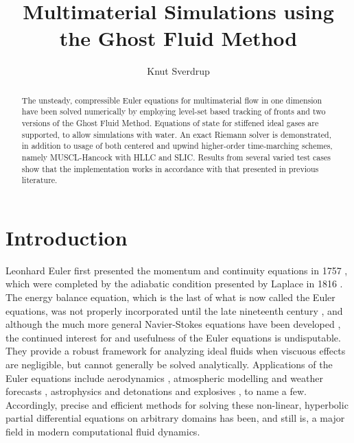\documentclass[final,3p,twocolumn]{elsarticle}
\begin{document}
\begin{frontmatter}

\title{Multimaterial Simulations using the Ghost Fluid Method}

\author{Knut Sverdrup}

\address{Cavendish Laboratory, Department of Physics, J J Thomson
  Avenue, Cambridge. CB3 0HE}

\begin{abstract}
    The unsteady, compressible Euler equations for multimaterial flow in one
    dimension have been solved numerically by employing level-set based
    tracking of fronts and two versions of the Ghost Fluid Method. Equations of
    state for stiffened ideal gases are supported, to allow simulations with
    water. An exact Riemann solver is demonstrated, in addition to usage of
    both centered and upwind higher-order time-marching schemes, namely
    MUSCL-Hancock with HLLC and SLIC. Results from several varied test cases
    show that the implementation works in accordance with that presented in
    previous literature. 
\end{abstract}

\end{frontmatter}

\section{Introduction}
\label{sec:introduction}

Leonhard Euler first presented the momentum and continuity equations in 1757
\cite{euler1757principes}, which were completed by the adiabatic condition
presented by Laplace in 1816 \cite{laplace1816vitesse}. The energy balance
equation, which is the last of what is now called the Euler equations,  was not
properly incorporated until the late nineteenth century
\cite{christodoulou2007euler}, and although the much more general Navier-Stokes
equations have been developed \cite{navier1822memoire, stokes1845theories}, the
continued interest for and usefulness of the Euler equations is undisputable.
They provide a robust framework for analyzing ideal fluids when viscuous
effects are negligible, but cannot generally be solved analytically.
Applications of the Euler equations include aerodynamics
\cite{drela1985twodimensional, anderson1986comparison, guruswamy1990unsteady},
atmospheric modelling and weather forecasts \cite{laprise1992euler,
skamarock2008time}, astrophysics \cite{trac2003primer} and detonations and
explosives \cite{nikiforakis1996numerical, williams1996detailed,
saurel2001multiphase}, to name a few.  Accordingly, precise and efficient
methods for solving these non-linear, hyperbolic partial differential equations
on arbitrary domains has been, and still is, a major field in modern
computational fluid dynamics. 
\end{document}
